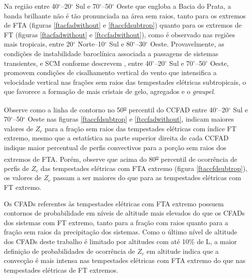 Na região entre 40$^{\circ}$--20$^{\circ}$ Sul e 70$^{\circ}$--50$^{\circ}$ Oeste que engloba a Bacia do Prata, a banda brilhante não é tão pronunciada na área sem raios, tanto para os extremos de FTA (figuras \ref{ftacfadwithout} e \ref{ftaccfdsubtrop}) quanto para os extremos de FT (figuras \ref{ftacfadwithout} e \ref{ftccfadwithout}), como é observado nas regiões mais tropicais, entre 20$^{\circ}$ Norte--10$^{\circ}$ Sul e 80$^{\circ}$--30$^{\circ}$ Oeste. Provavelmente, as condições de instabilidade baroclínica associada a passagens de sistemas transientes, e SCM conforme descrevem , entre 40$^{\circ}$--20$^{\circ}$ Sul e 70$^{\circ}$--50$^{\circ}$ Oeste, promovem condições de cisalhamento vertical do vento que intensifica a velocidade vertical nas frações sem raios das tempestades elétricas subtropicais, o que favorece a formação de mais cristais de gelo, agregados e o \textit{graupel}.

Observe como a linha de contorno no 50\textsuperscript{\underline{o}} percentil do CCFAD entre 40$^{\circ}$--20$^{\circ}$ Sul e 70$^{\circ}$--50$^{\circ}$ Oeste nas figuras \ref{ftaccfdsubtrop} e \ref{ftccfadwithout}, indicam maiores valores de $Z_c$ para a fração sem raios das tempestades elétricas com índice FT extremo, mesmo que a estatística na parte superior direita de cada CCFAD indique maior percentual de perfis convectivos para a porção sem raios dos extremos de FTA. Porém, observe que acima do 80\textsuperscript{\underline{o}} percentil de ocorrência de perfis de $Z_c$ das tempestades elétricas com FTA extremo (figura \ref{ftaccfdsubtrop}), os valores de $Z_c$ passam a ser maiores do que para as tempestades elétricas com FT extremo. 



Os CFADs referentes às tempestades elétricas com FTA extremo possuem contornos de probabilidade em níveis de altitude mais elevados do que os CFADs dos sistemas com FT extremo, tanto para a fração com raios quanto para a fração sem raios da precipitação dos sistemas. Como o último nível de altitude dos CFADs deste trabalho é limitado por altitudes com até 10\% de L, a maior definição de probabilidades de ocorrência de $Z_c$ em altitude indica que a convecção é mais intensa nas tempestades elétricas com FTA extremo do que nas tempestades elétricas de FT extremos.

